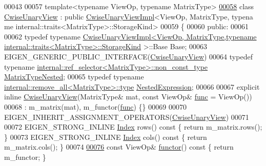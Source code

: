 \begin{DoxyCode}
00043 
00057 \textcolor{keyword}{template}<\textcolor{keyword}{typename} ViewOp, \textcolor{keyword}{typename} MatrixType>
\hyperlink{group___core___module}{00058} \textcolor{keyword}{class }\hyperlink{group___core___module_class_eigen_1_1_cwise_unary_view}{CwiseUnaryView} : \textcolor{keyword}{public} \hyperlink{class_eigen_1_1_cwise_unary_view_impl}{CwiseUnaryViewImpl}<ViewOp, MatrixType, typena
      me internal::traits<MatrixType>::StorageKind>
00059 \{
00060   \textcolor{keyword}{public}:
00061 
00062     \textcolor{keyword}{typedef} \textcolor{keyword}{typename} 
      \hyperlink{class_eigen_1_1_cwise_unary_view_impl}{CwiseUnaryViewImpl<ViewOp, MatrixType,typename internal::traits<MatrixType>::StorageKind}
      >::Base Base;
00063     EIGEN\_GENERIC\_PUBLIC\_INTERFACE(\hyperlink{group___core___module_class_eigen_1_1_cwise_unary_view}{CwiseUnaryView})
00064     \textcolor{keyword}{typedef} \textcolor{keyword}{typename} \hyperlink{class_eigen_1_1internal_1_1_tensor_lazy_evaluator_writable}{internal::ref\_selector<MatrixType>::non\_const\_type}
       \hyperlink{class_eigen_1_1internal_1_1_tensor_lazy_evaluator_writable}{MatrixTypeNested};
00065     \textcolor{keyword}{typedef} \textcolor{keyword}{typename} \hyperlink{group___sparse_core___module}{internal::remove\_all<MatrixType>::type} 
      \hyperlink{group___sparse_core___module}{NestedExpression};
00066 
00067     \textcolor{keyword}{explicit} \textcolor{keyword}{inline} \hyperlink{group___core___module_class_eigen_1_1_cwise_unary_view}{CwiseUnaryView}(MatrixType& mat, \textcolor{keyword}{const} ViewOp& 
      \hyperlink{structfunc}{func} = ViewOp())
00068       : m\_matrix(mat), m\_functor(\hyperlink{structfunc}{func}) \{\}
00069 
00070     EIGEN\_INHERIT\_ASSIGNMENT\_OPERATORS(\hyperlink{group___core___module_class_eigen_1_1_cwise_unary_view}{CwiseUnaryView})
00071 
00072     EIGEN\_STRONG\_INLINE \hyperlink{namespace_eigen_a62e77e0933482dafde8fe197d9a2cfde}{Index} rows()\textcolor{keyword}{ const }\{ \textcolor{keywordflow}{return} m\_matrix.rows(); \}
00073     EIGEN\_STRONG\_INLINE \hyperlink{namespace_eigen_a62e77e0933482dafde8fe197d9a2cfde}{Index} cols()\textcolor{keyword}{ const }\{ \textcolor{keywordflow}{return} m\_matrix.cols(); \}
00074 
\hyperlink{group___core___module_af01271cdadcbcf195b5d3130ff2e1a48}{00076}     \textcolor{keyword}{const} ViewOp& \hyperlink{group___core___module_af01271cdadcbcf195b5d3130ff2e1a48}{functor}()\textcolor{keyword}{ const }\{ \textcolor{keywordflow}{return} m\_functor; \}

\end{DoxyCode}
